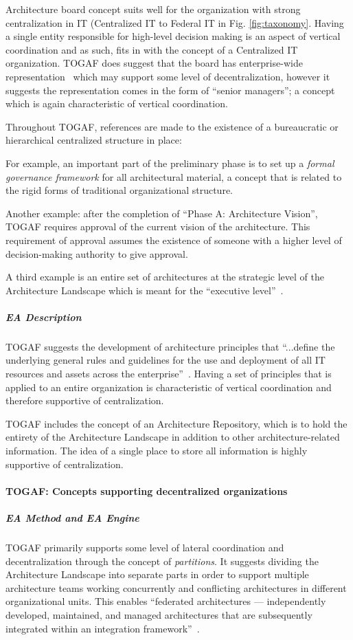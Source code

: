 Architecture board concept suits well for the organization with strong centralization in IT (Centralized IT to Federal IT in Fig. \ref{fig:taxonomy}.  Having a single entity responsible for high-level decision making is an aspect of vertical coordination  and as such,  fits in with the concept of a Centralized IT organization. TOGAF does suggest that the board has enterprise-wide representation~\cite[Ch. 47]{togaf9.1} which may support some level of decentralization, however it suggests the representation comes in the form of ``senior managers''; a concept which is again characteristic of vertical coordination. 

Throughout TOGAF, references are made to the existence of a bureaucratic or hierarchical centralized structure in place: 

For example, an important part of the preliminary phase is to set up a \textit{formal governance framework} for all architectural material, a concept that is related to the rigid forms of traditional organizational structure. 

Another example: after the completion of ``Phase A: Architecture Vision'', TOGAF requires approval of the current vision of the architecture. This requirement of approval assumes the existence of someone with a higher level of decision-making authority to give approval. 

A third example is an entire set of architectures at the strategic level of the Architecture Landscape which is meant for the ``executive level''~\cite[Ch. 20]{togaf9.1}.

\subparagraph*{EA Description}
TOGAF suggests the development of architecture principles that ``...define the underlying general rules and guidelines for the use and deployment of all IT resources and assets across the enterprise''~\cite[Ch. 23]{togaf9.1}. Having a set of principles that is applied to an entire organization is characteristic of vertical coordination and therefore supportive of centralization. 

TOGAF includes the concept of an Architecture Repository, which is to hold the entirety of the Architecture Landscape in addition to other architecture-related information. The idea of a single place to store all information is highly supportive of centralization. 

\paragraph*{TOGAF: Concepts supporting decentralized organizations}
\subparagraph*{EA Method and EA Engine}
TOGAF primarily supports some level of lateral coordination and decentralization through the concept of \textit{partitions}. It suggests dividing the Architecture Landscape into separate parts in order to support multiple architecture teams working concurrently and conflicting architectures in different organizational units. This enables ``federated architectures — independently developed, maintained, and managed architectures that are subsequently integrated within an integration framework''~\cite[Ch. 40.3]{togaf9.1}. 

